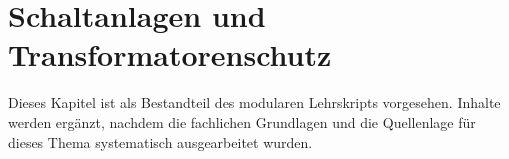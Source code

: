 \chapter{Schaltanlagen und Transformatorenschutz}
\label{chap:14-schaltanlagen-und-transformatorenschutz}

Dieses Kapitel ist als Bestandteil des modularen Lehrskripts vorgesehen.
Inhalte werden ergänzt, nachdem die fachlichen Grundlagen und die
Quellenlage für dieses Thema systematisch ausgearbeitet wurden.
